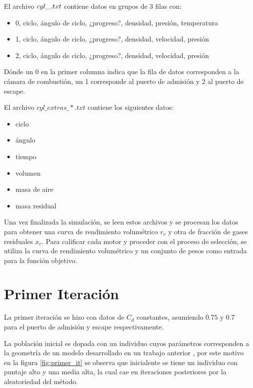 El archivo \emph{$cyl\_\*.txt$} contiene datos en grupos de 3 filas con:

\begin{itemize}
        \item 0, ciclo, ángulo de ciclo, ¿progreso?, densidad, presión, temperatura
        \item 1, ciclo, ángulo de ciclo, ¿progreso?, densidad, velocidad, presión
        \item 2, ciclo, ángulo de ciclo, ¿progreso?, densidad, velocidad, presión
\end{itemize}

Dónde un 0 en la primer columna indica que la fila de datos corresponden a la
cámara de combustión, un 1 corresponde al puerto de admisión y 2 al puerto de
escape.

El archivo \emph{$cyl\_extras\_*.txt$} contiene los siguientes datos:
\begin{itemize}
  \item ciclo
  \item ángulo
  \item tiempo
  \item volumen
  \item masa de aire
  \item masa residual
\end{itemize}

Una vez finalizada la simulación, se leen estos archivos y se procesan los datos
para obtener una curva de rendimiento volumétrico $r_{v}$ y otra de fracción de
gases residuales $x_{r}$.
%
Para calificar cada motor y proceder con el proceso de selección, se utiliza la
curva de rendimiento volumétrico y un conjunto de pesos como entrada para la
función objetivo.


\section{Primer Iteración}

La primer iteración se hizo con datos de $C_{d}$ constantes, asumiendo $0.75$ y
$0.7$ para el puerto de admisión y escape respectivamente.
%

La población inicial es dopada con un individuo cuyos parámetros corresponden a
la geometría de un modelo desarrollado en un trabajo anterior \cite{lopez13},
por este motivo en la figura \ref{fig:primer_it} se observa que inicialente se
tiene un individuo con puntaje alto y una media alta, la cual cae en
iteraciones posteriores por la aleatoriedad del método.

